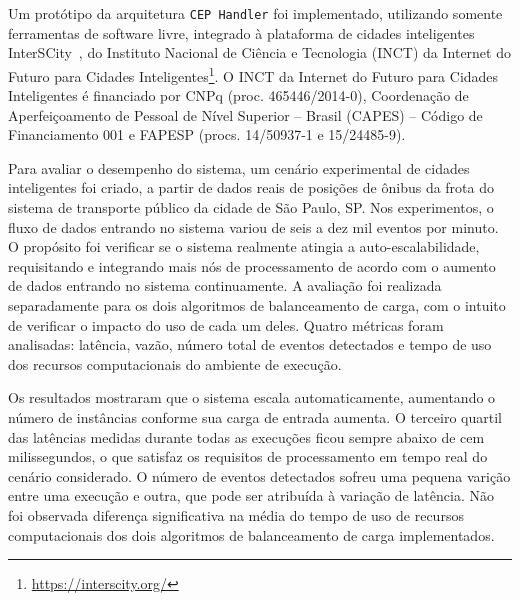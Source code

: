Um protótipo da arquitetura \texttt{CEP Handler} foi implementado, utilizando somente ferramentas de software livre, integrado à plataforma de cidades inteligentes InterSCity~\citep{del2019design}, do Instituto Nacional de Ciência e Tecnologia (INCT) da Internet do Futuro para Cidades Inteligentes\footnote{\url{https://interscity.org/}}. O INCT da Internet do Futuro para Cidades Inteligentes é financiado por CNPq (proc. 465446/2014-0), Coordenação de Aperfeiçoamento de Pessoal de Nível Superior – Brasil (CAPES) – Código de Financiamento 001 e FAPESP (procs. 14/50937-1 e 15/24485-9). 



Para avaliar o desempenho do sistema, um cenário experimental de cidades inteligentes foi criado, a partir de dados reais de posições de ônibus da frota do sistema de transporte público da cidade de São Paulo, SP.
Nos experimentos, o fluxo de dados entrando no sistema variou de seis a dez mil eventos por minuto. O propósito foi verificar se o sistema realmente atingia a auto-escalabilidade, requisitando e integrando mais nós de processamento de acordo com o aumento de dados entrando no sistema continuamente. A avaliação foi realizada separadamente para os dois algoritmos de balanceamento de carga, com o intuito de verificar o impacto do uso de cada um deles. 
Quatro métricas foram analisadas: latência, vazão, número total de eventos detectados e tempo de uso dos recursos computacionais do ambiente de execução. 

Os resultados mostraram que o sistema escala automaticamente, aumentando o número de instâncias conforme sua carga de entrada aumenta. O terceiro quartil das latências medidas durante todas as execuções ficou sempre abaixo de cem milissegundos, o que satisfaz os requisitos de processamento em tempo real do cenário considerado. O número de eventos detectados sofreu uma pequena varição entre uma execução e outra, que pode ser atribuída à variação de latência. 
Não foi observada diferença significativa na média do tempo de uso de recursos computacionais dos dois algoritmos de balanceamento de
carga implementados.





